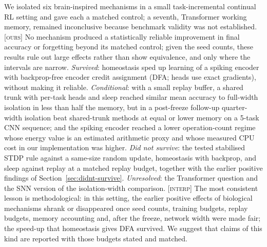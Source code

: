 \documentclass[10pt]{article}
\newcommand{\ours}{\textsc{[ours]}\xspace}
\newcommand{\interp}{\textsc{[interp]}\xspace}
\begin{document}
We isolated six brain-inspired mechanisms in a small task-incremental continual RL setting and gave each a matched
control; a seventh, Transformer working memory, remained inconclusive because benchmark validity was not established.
\ours No mechanism produced a statistically reliable improvement in final accuracy or forgetting beyond its matched
control; given the seed counts, these results rule out large effects rather than show equivalence, and only where the
intervals are narrow. \emph{Survived}: homeostasis sped up learning of a spiking encoder with backprop-free encoder
credit assignment (DFA; heads use exact gradients), without making it reliable. \emph{Conditional}: with a small replay
buffer, a shared trunk with per-task heads and sleep reached similar mean accuracy to full-width isolation in less than
half the memory, but in a post-freeze follow-up quarter-width isolation beat shared-trunk methods at equal or lower
memory on a 5-task CNN sequence; and the spiking encoder reached a lower operation-count regime whose energy value is
an estimated arithmetic proxy and whose measured CPU cost in our implementation was higher. \emph{Did not survive}: the
tested stabilised STDP rule against a same-size random update, homeostasis with backprop, and sleep against replay at a
matched replay budget, together with the earlier positive findings of Section~\ref{sec:didnt-survive}.
\emph{Unresolved}: the Transformer question and the SNN version of the isolation-width comparison. \interp The most
consistent lesson is methodological: in this setting, the earlier positive effects of biological mechanisms shrank or
disappeared once seed counts, training budgets, replay budgets, memory accounting and, after the freeze, network width
were made fair; the speed-up that homeostasis gives DFA survived. We suggest that claims of this kind are reported with
those budgets stated and matched.

\end{document}
